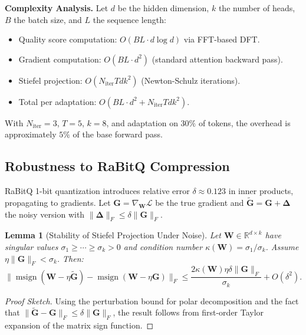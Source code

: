 \documentclass[twocolumn]{article}
\newtheorem{lemma}{Lemma}
\DeclareMathOperator{\msign}{msign}
\begin{document}
\textbf{Complexity Analysis.} Let $d$ be the hidden dimension, $k$ the number of heads, $B$ the batch size, and $L$ the sequence length:
\begin{itemize}[leftmargin=*]
    \item Quality score computation: $O(BL \cdot d \log d)$ via FFT-based DFT.
    \item Gradient computation: $O(BL \cdot d^2)$ (standard attention backward pass).
    \item Stiefel projection: $O(N_{\mathrm{iter}} T d k^2)$ (Newton-Schulz iterations).
    \item Total per adaptation: $O(BL \cdot d^2 + N_{\mathrm{iter}} T d k^2)$.
\end{itemize}
With $N_{\mathrm{iter}} = 3$, $T = 5$, $k = 8$, and adaptation on $30\%$ of tokens, the overhead is approximately $5\%$ of the base forward pass.

\subsection{Robustness to RaBitQ Compression}
\label{sec:robustness}

RaBitQ 1-bit quantization introduces relative error $\delta \approx 0.123$ in inner products, propagating to gradients. Let $\mathbf{G} = \nabla_{\mathbf{W}} \mathcal{L}$ be the true gradient and $\tilde{\mathbf{G}} = \mathbf{G} + \boldsymbol{\Delta}$ the noisy version with $\|\boldsymbol{\Delta}\|_F \leq \delta \|\mathbf{G}\|_F$.

\begin{lemma}[Stability of Stiefel Projection Under Noise]
\label{lem:stability}
Let $\mathbf{W} \in \mathbb{R}^{d \times k}$ have singular values $\sigma_1 \geq \cdots \geq \sigma_k > 0$ and condition number $\kappa(\mathbf{W}) = \sigma_1 / \sigma_k$. Assume $\eta \|\mathbf{G}\|_F < \sigma_k$. Then:
\begin{equation}
\|\msign(\mathbf{W} - \eta \tilde{\mathbf{G}}) - \msign(\mathbf{W} - \eta \mathbf{G})\|_F \leq \frac{2\kappa(\mathbf{W}) \eta \delta \|\mathbf{G}\|_F}{\sigma_k} + O(\delta^2).
\end{equation}
\end{lemma}

\begin{proof}[Proof Sketch]
Using the perturbation bound for polar decomposition \cite{higham1986polar} and the fact that $\|\tilde{\mathbf{G}} - \mathbf{G}\|_F \leq \delta \|\mathbf{G}\|_F$, the result follows from first-order Taylor expansion of the matrix sign function.
\end{proof}
\end{document}

